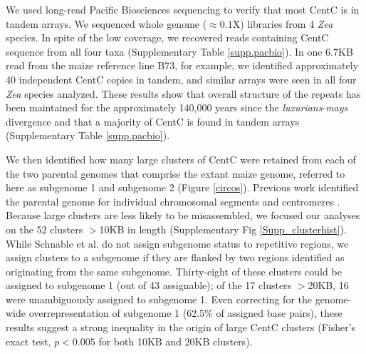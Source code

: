We used long-read Pacific Biosciences sequencing to verify that most CentC is in tandem arrays. We sequenced whole genome ($\approx 0.1$X) libraries from 4 \emph{Zea} species.  In spite of the low coverage, we recovered reads containing CentC sequence from all four taxa (Supplementary Table \ref{supp.pacbio}).  In one 6.7KB read from the maize reference line B73, for example, we identified approximately 40 independent CentC copies in tandem, and similar arrays were seen in all four \emph{Zea} species analyzed.  These results show that overall structure of the repeats has been maintained for the approximately 140,000 years since the \emph{luxurians}-\emph{mays} divergence \citep{Hanson1996,  Ross-Ibarra2009} and that a majority of CentC is found in tandem arrays (Supplementary Table \ref{supp.pacbio}).

We then identified how many large clusters of CentC were retained from each of the two parental genomes that comprise the extant maize genome, referred to here as subgenome 1 and subgenome 2 (Figure \ref{circos}).  Previous work identified the parental genome for individual chromosomal segments \citep{Schnable2011} and centromeres \citep{Wang2012}.  Because large clusters are less likely to be misassembled, we focused our analyses on the 52 clusters $>$10KB in length (Supplementary Fig \ref{Supp_clusterhist}).  While Schnable et al. \citet{Schnable2011} do not assign subgenome status to repetitive regions, we assign clusters to a subgenome if they are flanked by two regions identified as originating from the same  subgenome.  Thirty-eight of these clusters could be assigned to subgenome 1 (out of 43 assignable); of the 17 clusters $>$20KB, 16 were unambiguously assigned to subgenome 1.  Even correcting for the genome-wide overrepresentation of subgenome 1 (62.5\% of assigned base pairs), these results suggest a strong inequality in the origin of large CentC clusters (Fisher's exact test, $p<0.005$ for both 10KB and 20KB clusters).

